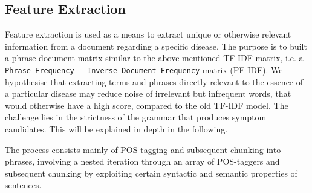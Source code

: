 \documentclass[10pt,letterpaper,final]{article}
\begin{document}
\subsection{Feature Extraction}
Feature extraction is used as a means to extract unique or otherwise
relevant information from a document regarding a specific disease. The
purpose is to built a phrase document matrix similar to the above
mentioned TF-IDF matrix, i.e. a \texttt{Phrase Frequency - Inverse
Document Frequency} matrix (PF-IDF). We hypothesise that extracting
terms and phrases directly relevant to the essence of a particular
disease may reduce noise of irrelevant but infrequent words, that would
otherwise have a high score, compared to the old TF-IDF model. The
challenge lies in the strictness of the grammar that produces symptom
candidates. This will be explained in depth in the following.

The process consists mainly of POS-tagging and subsequent chunking into
phrases, involving a nested iteration through an array of POS-taggers
and subsequent chunking by exploiting certain syntactic and semantic
properties of sentences.
\end{document}
